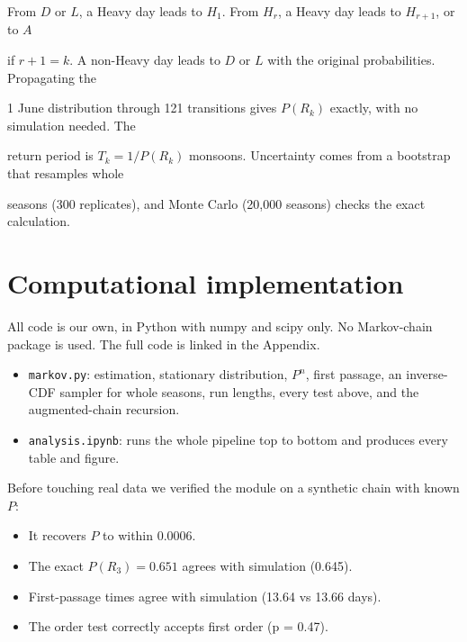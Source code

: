 \documentclass[11pt,a4paper]{article}
\providecommand{\tightlist}{\setlength{\itemsep}{0pt}\setlength{\parskip}{0pt}}
\begin{document}
From \(D\) or \(L\), a Heavy day leads to \(H_1\). From \(H_r\), a Heavy day leads to \(H_{r+1}\), or to \(A\)

if \(r+1=k\). A non-Heavy day leads to \(D\) or \(L\) with the original probabilities. Propagating the

1 June distribution through 121 transitions gives \(P(R_k)\) exactly, with no simulation needed. The

return period is \(T_k=1/P(R_k)\) monsoons. Uncertainty comes from a bootstrap that resamples whole

seasons (300 replicates), and Monte Carlo (20,000 seasons) checks the exact calculation.



\section{Computational implementation}\label{computational-implementation}



All code is our own, in Python with numpy and scipy only. No Markov-chain package is used. The full code is linked in the Appendix.



\begin{itemize}

\tightlist

\item

  \texttt{markov.py}: estimation, stationary distribution, \(P^n\), first passage, an inverse-CDF sampler for whole seasons, run lengths, every test above, and the augmented-chain recursion.

\item

  \texttt{analysis.ipynb}: runs the whole pipeline top to bottom and produces every table and figure.

\end{itemize}



Before touching real data we verified the module on a synthetic chain with known \(P\):



\begin{itemize}

\tightlist

\item

  It recovers \(P\) to within 0.0006.

\item

  The exact \(P(R_3)=0.651\) agrees with simulation (0.645).

\item

  First-passage times agree with simulation (13.64 vs 13.66 days).

\item

  The order test correctly accepts first order (p = 0.47).

\end{itemize}
\end{document}
